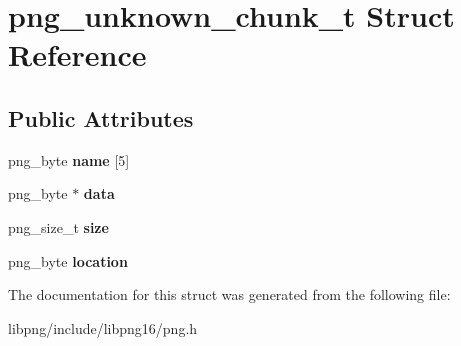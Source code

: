 \hypertarget{structpng__unknown__chunk__t}{\section{png\-\_\-unknown\-\_\-chunk\-\_\-t Struct Reference}
\label{structpng__unknown__chunk__t}
}
\subsection*{Public Attributes}
\begin{DoxyCompactItemize}
\item 
\hypertarget{structpng__unknown__chunk__t_a8248a7c49234f9dc5fa3fa16a2d3d34c}{png\-\_\-byte {\bfseries name} \mbox{[}5\mbox{]}}\label{structpng__unknown__chunk__t_a8248a7c49234f9dc5fa3fa16a2d3d34c}

\item 
\hypertarget{structpng__unknown__chunk__t_afac46904a501dc44f50a6cf342ad4038}{png\-\_\-byte $\ast$ {\bfseries data}}\label{structpng__unknown__chunk__t_afac46904a501dc44f50a6cf342ad4038}

\item 
\hypertarget{structpng__unknown__chunk__t_a0a691245e0c04f01ecf767f215b6a652}{png\-\_\-size\-\_\-t {\bfseries size}}\label{structpng__unknown__chunk__t_a0a691245e0c04f01ecf767f215b6a652}

\item 
\hypertarget{structpng__unknown__chunk__t_af56bfc32223b97fbcb6bd29ba7a1cc29}{png\-\_\-byte {\bfseries location}}\label{structpng__unknown__chunk__t_af56bfc32223b97fbcb6bd29ba7a1cc29}

\end{DoxyCompactItemize}


The documentation for this struct was generated from the following file\-:\begin{DoxyCompactItemize}
\item 
libpng/include/libpng16/png.\-h\end{DoxyCompactItemize}
